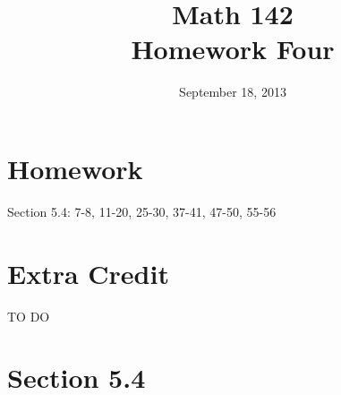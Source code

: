 \documentclass{exam}
\author{}
\date{September 18, 2013}
\title{Math 142 \\ Homework Four}
\begin{document}
  \maketitle

  \section{Homework}
  Section 5.4: 7-8, 11-20, 25-30, 37-41, 47-50, 55-56

  \section{Extra Credit}
  TO DO

  \ifprintanswers

    \pagebreak

    \section{Section 5.4}
\end{document}
